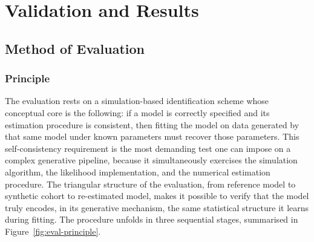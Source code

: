 \documentclass{rapportCS}
\begin{document}

\newpage

\section{Validation and Results}

\subsection{Method of Evaluation}

\subsubsection{Principle}

The evaluation rests on a simulation-based identification scheme whose conceptual core is the following: if a model is correctly specified and its estimation procedure is consistent, then fitting the model on data generated by that same model under known parameters must recover those parameters. This self-consistency requirement is the most demanding test one can impose on a complex generative pipeline, because it simultaneously exercises the simulation algorithm, the likelihood implementation, and the numerical estimation procedure. The triangular structure of the evaluation, from reference model to synthetic cohort to re-estimated model, makes it possible to verify that the model truly encodes, in its generative mechanism, the same statistical structure it learns during fitting.
The procedure unfolds in three sequential stages, summarised in Figure~\ref{fig:eval-principle}.
\end{document}
